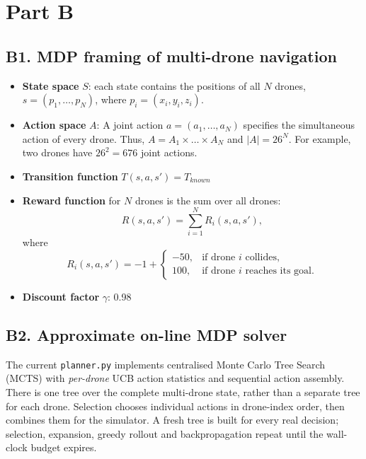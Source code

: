 \documentclass[11pt,a4paper]{article}
\begin{document}
\section*{Part B}

\subsection*{B1. MDP framing of multi-drone navigation}

\begin{itemize}
  \item \textbf{State space} $S$: each state contains the positions of all $N$ drones, $s=(p_1,\dots,p_N)$, where $p_i=(x_i,y_i,z_i)$. 
  \item \textbf{Action space} $A$: A joint action $a=(a_1,\dots,a_N)$ specifies the simultaneous action of every drone. Thus, $A=A_1\times\dots\times A_N$ and $|A|=26^N$. For example, two drones have $26^2=676$ joint actions.
  \item \textbf{Transition function} $T(s,a,s') = T_{known}$
  \item \textbf{Reward function} for $N$ drones is the sum over all drones:
  \[
    R(s,a,s') = \sum_{i=1}^{N} R_i(s,a,s'),
  \]
  where
  \[
    R_i(s,a,s') = -1 + \begin{cases}
      -50, & \text{if drone $i$ collides},\\
      100, & \text{if drone $i$ reaches its goal}.
    \end{cases}
  \]
  \item \textbf{Discount factor} $\gamma$: 0.98
\end{itemize}

\subsection*{B2. Approximate on-line MDP solver}

The current \texttt{planner.py} implements centralised Monte Carlo Tree Search (MCTS) with \emph{per-drone} UCB action statistics and sequential action assembly. There is one tree over the complete multi-drone state, rather than a separate tree for each drone. Selection chooses individual actions in drone-index order, then combines them for the simulator. A fresh tree is built for every real decision; selection, expansion, greedy rollout and backpropagation repeat until the wall-clock budget expires.
\end{document}
